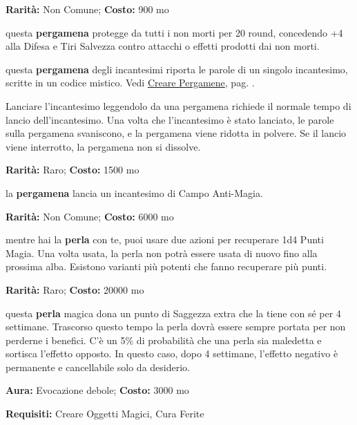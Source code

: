 \begin{multicols}{2}

\textbf{Rarità:} Non Comune; \textbf{Costo:} 900 mo

questa \textbf{pergamena} protegge da tutti i non morti per 20 round, concedendo +4 alla Difesa e Tiri Salvezza contro attacchi o effetti prodotti dai non morti.


questa \textbf{pergamena} degli incantesimi riporta le parole di un singolo incantesimo, scritte in un codice mistico. Vedi \hyperlink{crearepergamene}{Creare Pergamene}, pag. \pageref{crearepergamene}.

Lanciare l'incantesimo leggendolo da una pergamena richiede il normale tempo di lancio dell'incantesimo. Una volta che l'incantesimo è stato lanciato, le parole sulla pergamena svaniscono, e la pergamena viene ridotta in polvere. Se il lancio viene interrotto, la pergamena non si dissolve.


\textbf{Rarità:} Raro; \textbf{Costo:} 1500 mo

la \textbf{pergamena} lancia un incantesimo di Campo Anti-Magia.


\textbf{Rarità:} Non Comune; \textbf{Costo:} 6000 mo

mentre hai la \textbf{perla} con te, puoi usare due azioni per recuperare 1d4 Punti Magia. Una volta usata, la perla non potrà essere usata di nuovo fino alla prossima alba. Esistono varianti più potenti che fanno recuperare più punti.


\textbf{Rarità:} Raro; \textbf{Costo:} 20000 mo

questa \textbf{perla} magica dona un punto di Saggezza extra che la tiene con sé per 4 settimane. Trascorso questo tempo la perla dovrà essere sempre portata per non perderne i benefici. C'è un 5\% di probabilità che una perla sia maledetta e sortisca l'effetto opposto. In questo caso, dopo 4 settimane, l'effetto negativo è permanente e cancellabile solo da desiderio.


\textbf{Aura:} Evocazione debole; \textbf{Costo:} 3000 mo

\textbf{Requisiti:} Creare Oggetti Magici, Cura Ferite


\end{multicols}
